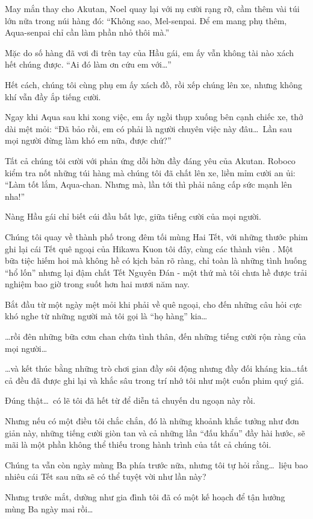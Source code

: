 \documentclass[../main.tex]{subfiles}
\begin{document}
May mắn thay cho Akutan, Noel quay lại với nụ cười rạng rỡ, cầm thêm vài túi lớn nữa trong núi hàng đó: ``Không sao, Mel-senpai. Để em mang phụ thêm, Aqua-senpai chỉ cần làm phần nhỏ thôi mà.''

Mặc do số hàng đã vơi đi trên tay của Hầu gái, em ấy vẫn không tài nào xách hết chúng được. ``Ai đó làm ơn cứu em với\dots''

Hết cách, chúng tôi cùng phụ em ấy xách đồ, rồi xếp chúng lên xe, nhưng không khí vẫn đầy ắp tiếng cười.

Ngay khi Aqua sau khi xong việc, em ấy ngồi thụp xuống bên cạnh chiếc xe, thở dài mệt mỏi: ``Đã bảo rồi, em có phải là người chuyên việc này đâu\dots\ Lần sau mọi người đừng làm khó em nữa, được chứ?''

Tất cả chúng tôi cười với phản ứng dỗi hờn đầy đáng yêu của Akutan. Roboco kiểm tra nốt những túi hàng mà chúng tôi đã chất lên xe, liền mỉm cười an ủi: ``Làm tốt lắm, Aqua-chan. Nhưng mà, lần tới thì phải nâng cấp sức mạnh lên nha!''

Nàng Hầu gái chỉ biết cúi đầu bất lực, giữa tiếng cười của mọi người.

\ct

Chúng tôi quay về thành phố trong đêm tối mùng Hai Tết, với những thước phim ghi lại cái Tết quê ngoại của Hikawa Kuon tôi đây, cùng các thành viên \hll. Một bữa tiệc hiếm hoi mà không hề có kịch bản rõ ràng, chỉ toàn là những tình huống ``hổ lốn'' nhưng lại đậm chất Tết Nguyên Đán - một thứ mà tôi chưa hề được trải nghiệm bao giờ trong suốt hơn hai mươi năm nay.

Bắt đầu từ một ngày mệt mỏi khi phải về quê ngoại, cho đến những câu hỏi cực khó nghe từ những người mà tôi gọi là ``họ hàng'' kia\dots

\dots rồi đên những bữa cơm chan chứa tình thân, đến những tiếng cười rộn ràng của mọi người\dots

\dots và kết thúc bằng những trò chơi gian đầy sôi động nhưng đầy đối kháng kia\dots tất cả đều đã được ghi lại và khắc sâu trong trí nhớ tôi như một cuốn phim quý giá.

Đúng thật\dots\ có lẽ tôi đã hết từ để diễn tả chuyến du ngoạn này rồi.

Nhưng nếu có một điều tôi chắc chắn, đó là những khoảnh khắc tưởng như đơn giản này, những tiếng cười giòn tan và cả những lần ``đấu khẩu'' đầy hài hước, sẽ mãi là một phần không thể thiếu trong hành trình của tất cả chúng tôi.

Chúng ta vẫn còn ngày mùng Ba phía trước nữa, nhưng tôi tự hỏi rằng\dots\ liệu bao nhiêu cái Tết sau nữa sẽ có thể tuyệt vời như lần này?

Nhưng trước mắt, dường như gia đình tôi đã có một kế hoạch để tận hưởng mùng Ba ngày mai rồi\dots
\end{document}
